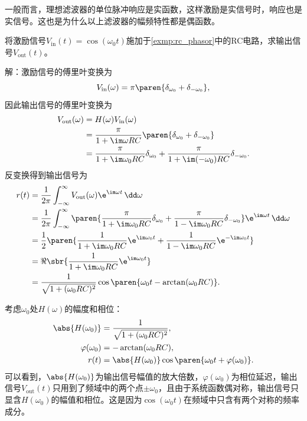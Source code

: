 一般而言，理想滤波器的单位脉冲响应是实函数，这样激励是实信号时，响应也是实信号。这也是为什么以上滤波器的幅频特性都是偶函数。
\begin{example}
    将激励信号$V_{\text{in}}(t)=\cos(\omega_0 t)$施加于\cref{exmp:rc_phasor}中的RC电路，求输出信号$V_{\text{out}}(t)$。

    解：激励信号的傅里叶变换为
    \begin{equation}
        V_{\text{in}}(\omega)=\pi\paren{\delta_{\omega_0}+\delta_{-\omega_0}},
    \end{equation}
    因此输出信号的傅里叶变换为
    \begin{align}
        V_{\text{out}}(\omega)&=H(\omega)V_{\text{in}}(\omega)\nonumber\\
        &=\frac{\pi}{1+\im\omega RC}\paren{\delta_{\omega_0}+\delta_{-\omega_0}}\nonumber\\
        &=\frac{\pi}{1+\im\omega_0 RC}\delta_{\omega_0}+\frac{\pi}{1+\im(-\omega_0) RC}\delta_{-\omega_0}.
    \end{align}
    反变换得到输出信号为
    \begin{align}
        r(t)&=\frac{1}{2\pi}\int_{-\infty}^{\infty}V_{\text{out}}(\omega)\e^{\im\omega t}\,\dd\omega\nonumber\\
        &=\frac{1}{2\pi}\int_{-\infty}^{\infty}\paren{\frac{\pi}{1+\im\omega_0 RC}\delta_{\omega_0}+\frac{\pi}{1-\im\omega_0 RC}\delta_{-\omega_0}}\e^{\im\omega t}\,\dd\omega\nonumber\\
        &=\frac{1}{2}\paren{\frac{1}{1+\im\omega_0 RC}\e^{\im\omega_0 t}+\frac{1}{1-\im\omega_0 RC}\e^{-\im\omega_0 t}}\nonumber\\
        &=\Re\sbr{\frac{1}{1+\im\omega_0 RC}\e^{\im\omega_0 t}}\nonumber\\
        &=\frac{1}{\sqrt{1+(\omega_0 RC)^2}}\cos\paren{\omega_0 t-\arctan(\omega_0 RC)}.
    \end{align}

    考虑$\omega_0$处$H(\omega)$的幅度和相位：
    \begin{align}
        \abs{H(\omega_0)}&=\frac{1}{\sqrt{1+(\omega_0 RC)^2}},\\
        \varphi(\omega_0)&=-\arctan(\omega_0 RC),\\
        r(t)&=\abs{H(\omega_0)}\cos\paren{\omega_0 t+\varphi(\omega_0)}.
    \end{align}
    可以看到，$\abs{H(\omega_0)}$为输出信号幅值的放大倍数，$\varphi(\omega_0)$为相位延迟，输出信号$V_{\text{out}}(t)$只用到了频域中的两个点$\pm\omega_0$，且由于系统函数偶对称，输出信号只显含$H(\omega_0)$的幅值和相位。这是因为$\cos(\omega_0 t)$在频域中只含有两个对称的频率成分。
\end{example}

